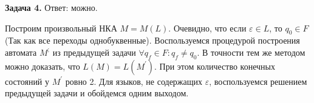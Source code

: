 \documentclass[12pt]{article}
\begin{document}
    \textbf{Задача 4.}
       Ответ: можно.

       Построим произвольный НКА $M = M(L)$. Очевидно, что если $\varepsilon \in L$, то $q_0 \in F$(Так как все переходы однобуквенные). Воспользуемся процедурой построения автомата $M^{;}$ из предыдущей задачи $\forall q_f \in F: q_f \neq q_0$. В точности тем же методом можно доказать, что $L(M) = L(M^{'})$. При этом количество конечных состояний у $M^{'}$ ровно 2. Для языков, не содержащих $\varepsilon$, воспользуемся решением предыдущей задачи и обойдемся одним выходом.
\end{document}
